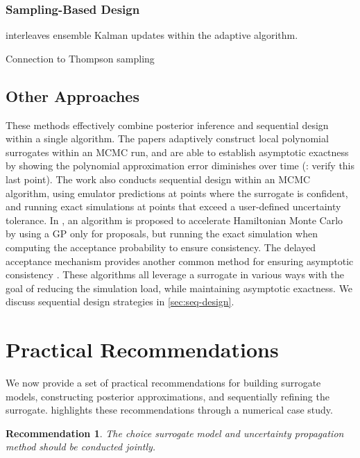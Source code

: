 \documentclass[12pt]{article}
\newtheorem{rec}{Recommendation}
\begin{document}
\subsubsection{Sampling-Based Design}
\citet{FerEmulation,hydrologicalModel,quantileApprox}
\citet{adaptiveMultimodal} interleaves ensemble Kalman updates within the adaptive algorithm.

Connection to Thompson sampling

\subsection{Other Approaches}
These methods effectively combine posterior
inference and sequential design within a single algorithm.
The papers \citet{Li_2014,ConradLocalExactMCMC} 
adaptively construct local polynomial surrogates within an MCMC run, and are able to establish asymptotic 
exactness by showing the polynomial 
approximation error diminishes over time (\todo: verify this last point). The work \citep{ActiveLearningMCMC}
also conducts sequential design within an MCMC algorithm, using emulator predictions at points where the 
surrogate is confident, and running exact simulations at points that exceed a user-defined uncertainty tolerance.
In \citet{MCMC_GP_proposal}, an algorithm is proposed to accelerate Hamiltonian Monte Carlo by using a 
GP only for proposals, but running the exact simulation when computing the acceptance probability to 
ensure consistency. The delayed acceptance mechanism provides another common method for ensuring
asymptotic consistency \citep{DelayedAcceptance}.
These algorithms all leverage a surrogate in various ways with the goal of reducing the simulation load, while
maintaining asymptotic exactness. We discuss sequential design strategies in \cref{sec:seq-design}.

\section{Practical Recommendations} \label{sec:recs}
We now provide a set of practical recommendations for building surrogate models, constructing
posterior approximations, and sequentially refining the surrogate. 
highlights these recommendations through a numerical case study.

\begin{rec} \label{rec:prop-uncertainty}
The choice surrogate model and uncertainty propagation method should be conducted jointly.
\end{rec}
\end{document}
